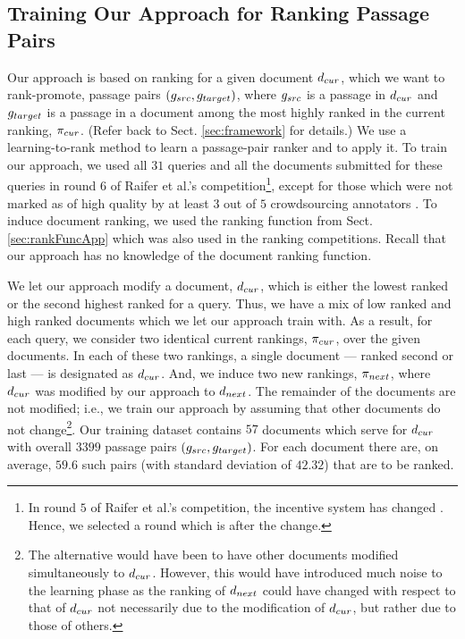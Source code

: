 \subsection{Training Our Approach for Ranking Passage Pairs}
\label{sec:offlineApp}
Our approach is based on ranking for a given document $d_{cur}$, which we want to rank-promote, passage pairs
$(g_{src},g_{target})$, where $g_{src}$ is a passage in $d_{cur}$ and $g_{target}$ is a
passage in a document among the most highly ranked in the current
ranking, $\pi_{cur}$. (Refer back to Sect. \ref{sec:framework} for
details.)  We use a learning-to-rank method to learn a passage-pair ranker and to apply it. To train our approach, we used all $31$ queries and all the
documents submitted for these queries in round $6$ of Raifer et al.'s
competition\footnote{In round $5$ of Raifer et al.'s
  competition, the incentive system has changed
  \cite{Raifer+al:17a}. Hence, we selected a round which is after the
  change.}, except for those which were not marked as of high quality
by at least $3$ out of $5$ crowdsourcing annotators
\cite{Raifer+al:17a}. To induce document ranking, we used the 
ranking function from Sect. \ref{sec:rankFuncApp} which was also used in the ranking competitions. Recall that our approach has no knowledge of the document ranking
function.

We let our approach modify a document, $d_{cur}$, which is either the
lowest ranked or the second highest ranked 
for a query. Thus, we have a mix of low ranked and high ranked
documents which we let our approach train with. As a result, for each
query, we consider two identical current rankings, $\pi_{cur}$, over
the given documents. In each of these two rankings, a single document
--- ranked second or last --- is designated as $d_{cur}$. And, we
induce two new rankings, $\pi_{next}$, where $d_{cur}$ was modified by
our approach to $d_{next}$. The remainder of the documents are not modified;
i.e., we train our approach by assuming that other documents do
not change\footnote{The alternative would have been to have other
  documents modified simultaneously to $d_{cur}$. However, this would have introduced much noise
  to the learning phase as the ranking of $d_{next}$ could have
  changed with respect to that of $d_{cur}$ not necessarily due to the modification of $d_{cur}$, but rather
  due to those of others.}. Our training dataset contains $57$ documents which serve for $d_{cur}$ with overall $3399$ passage pairs $(g_{src},g_{target})$. For each document there are, on average, $59.6$ such pairs (with standard deviation of $42.32$) that are to be ranked.

